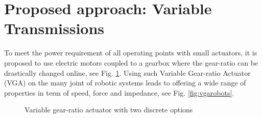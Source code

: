 %




\section{Proposed approach: Variable Transmissions}
\label{sec:ProposedSolutionRobotsUsingMultipleGearRatioActuators}


To meet the power requirement of all operating points with small actuators, it is proposed to use electric motors coupled to a gearbox where the gear-ratio can be drastically changed online, see Fig. \ref{fig:2s}. Using such Variable Gear-ratio Actuator (VGA) on the many joint of robotic systems leads to offering a wide range of properties in term of speed, force and impedance, see Fig. \ref{fig:vgarobots}.

\begin{figure}[htb]
        \centering
        \caption{Variable gear-ratio actuator with two discrete options}\label{fig:2s}
\end{figure}

